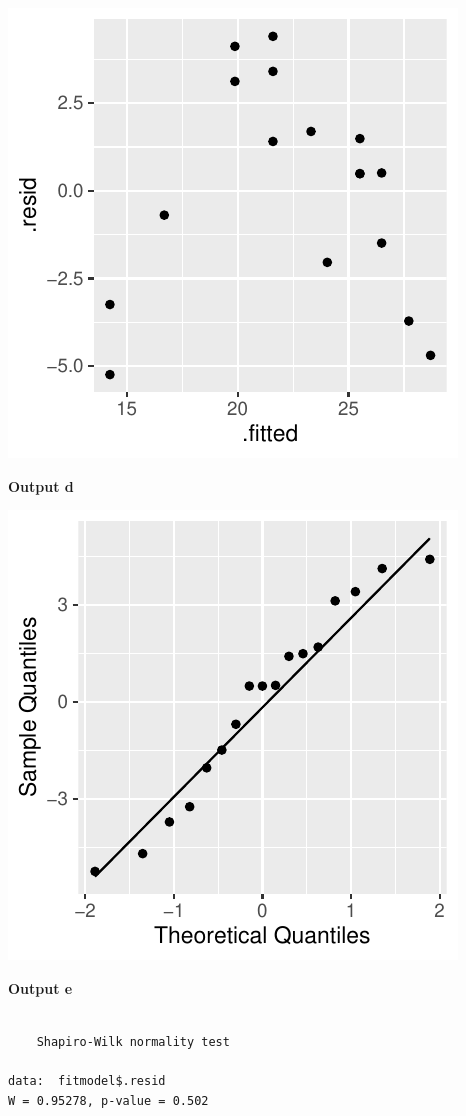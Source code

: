 \documentclass[]{article}
\begin{document}
\includegraphics{modelquestions_discussions_files/figure-latex/unnamed-chunk-4-1.pdf}

\textbf{Output d}

\includegraphics{modelquestions_discussions_files/figure-latex/unnamed-chunk-5-1.pdf}

\textbf{Output e}

\begin{verbatim}

    Shapiro-Wilk normality test

data:  fitmodel$.resid
W = 0.95278, p-value = 0.502
\end{verbatim}
\end{document}
